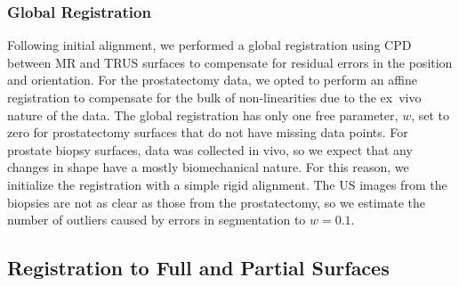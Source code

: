 \documentclass[journal]{IEEEtran}
\newcommand{\note}[1]{\textcolor{blue}{#1}}
\begin{document}
\subsubsection{Global Registration}\label{sec:data3}
Following initial alignment, we performed a global registration using CPD~\cite{Myronenko10a} between MR and TRUS surfaces to compensate for residual errors in the position and orientation. For the prostatectomy data, we opted to perform an affine registration to compensate for the bulk of non-linearities due to the ex~vivo nature of the data. The global registration has only one free parameter, $w$, set to zero for prostatectomy surfaces that do not have missing data points. For prostate biopsy surfaces, data was collected in vivo, so we expect that any changes in shape have a mostly biomechanical nature.  For this reason, we initialize the registration with a simple rigid alignment.  The US images from the biopsies are not as clear as those from the prostatectomy, so we estimate the number of outliers caused by errors in segmentation to $w=0.1$.

\subsection{Registration to Full and Partial Surfaces}\label{sec:exp1}
\end{document}
